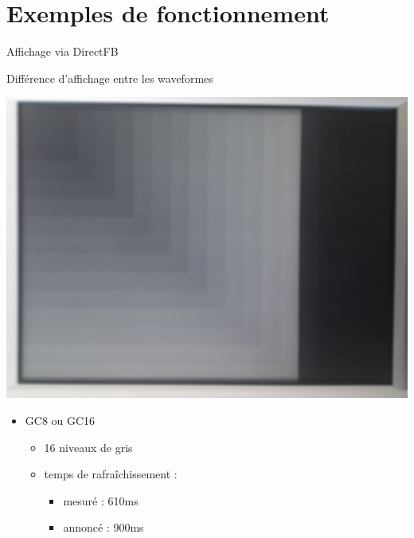 \section[Exemples]{Exemples de fonctionnement}

\begin{frame}{ Affichage via DirectFB }
	\begin{block} { Différence d'affichage entre les waveformes }
		\parbox{0.3\linewidth}{
			\includegraphics[angle=-90,origin=c,scale=0.04]{gc8_4.jpg}
		}
		\parbox{0.6\linewidth}{
			\begin{itemize}
				\item GC8 ou GC16
				\begin{itemize}
					\item 16 niveaux de gris
					\item temps de rafraîchissement : 
					\begin{itemize}
						\item mesuré  : 610ms
						\item annoncé  : 900ms
					\end{itemize}		
				\end{itemize}
			\end{itemize}
		}
	\end{block}
\end{frame}

